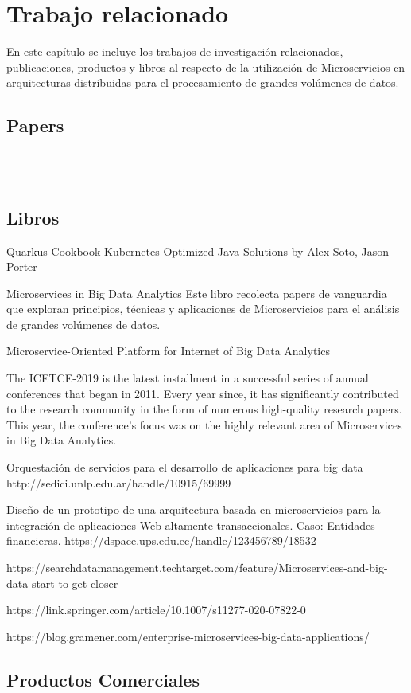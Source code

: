 \chapter{Trabajo relacionado}

En este capítulo se incluye los trabajos de investigación relacionados, publicaciones, productos y libros al respecto de la utilización de Microservicios en arquitecturas distribuidas para el procesamiento de grandes volúmenes de datos.


\section{Papers}


\\

\\
 

\section{Libros}

Quarkus Cookbook Kubernetes-Optimized Java Solutions by Alex Soto, Jason Porter

\par


Microservices in Big Data Analytics
\cite{MicroservicesInBigDataAnalytics}
Este libro recolecta papers de vanguardia que exploran principios, técnicas y aplicaciones de Microservicios para el análisis de grandes volúmenes de datos.
\par

Microservice-Oriented Platform for Internet of Big Data Analytics
\cite{3084568720190306}

\par




The ICETCE-2019 is the latest installment in a successful series of annual conferences that began in 2011. Every year since, it has significantly contributed to the research community in the form of numerous high-quality research papers. This year, the conference’s focus was on the highly relevant area of Microservices in Big Data Analytics.


Orquestación de servicios para el desarrollo de aplicaciones para big data
http://sedici.unlp.edu.ar/handle/10915/69999


Diseño de un prototipo de una arquitectura basada en microservicios para la integración de aplicaciones Web altamente transaccionales. Caso: Entidades financieras.
https://dspace.ups.edu.ec/handle/123456789/18532

https://searchdatamanagement.techtarget.com/feature/Microservices-and-big-data-start-to-get-closer

https://link.springer.com/article/10.1007/s11277-020-07822-0

https://blog.gramener.com/enterprise-microservices-big-data-applications/

\section{Productos Comerciales}